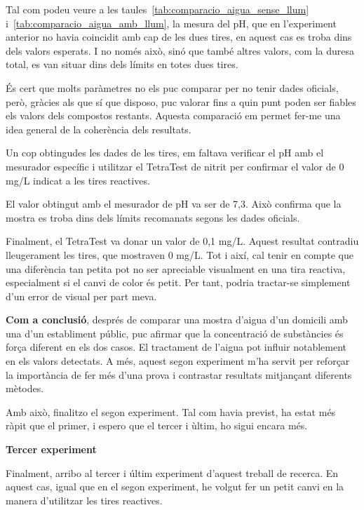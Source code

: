 Tal com podeu veure a les taules~\ref{tab:comparacio_aigua_sense_llum} i~\ref{tab:comparacio_aigua_amb_llum}, la mesura del pH, que en l’experiment anterior no havia coincidit amb cap de les dues tires, en aquest cas es troba dins dels valors esperats. I no només això, sinó que també altres valors, com la duresa total, es van situar dins dels límits en totes dues tires.

És cert que molts paràmetres no els puc comparar per no tenir dades oficials, però, gràcies als que sí que disposo, puc valorar fins a quin punt poden ser fiables els valors dels compostos restants. Aquesta comparació em permet fer-me una idea general de la coherència dels resultats.

Un cop obtingudes les dades de les tires, em faltava verificar el pH amb el mesurador específic i utilitzar el TetraTest de nitrit per confirmar el valor de 0 mg/L indicat a les tires reactives.

El valor obtingut amb el mesurador de pH va ser de 7,3. Això confirma que la mostra es troba dins dels límits recomanats segons les dades oficials.

Finalment, el TetraTest va donar un valor de 0,1 mg/L. Aquest resultat contradiu lleugerament les tires, que mostraven 0 mg/L. Tot i així, cal tenir en compte que una diferència tan petita pot no ser apreciable visualment en una tira reactiva, especialment si el canvi de color és petit. Per tant, podria tractar-se simplement d’un error de visual per part meva.

\textbf{Com a conclusió}, després de comparar una mostra d’aigua d’un domicili amb una d’un establiment públic, puc afirmar que la concentració de substàncies és força diferent en els dos casos. El tractament de l’aigua pot influir notablement en els valors detectats. A més, aquest segon experiment m’ha servit per reforçar la importància de fer més d’una prova i contrastar resultats mitjançant diferents mètodes.

Amb això, finalitzo el segon experiment. Tal com havia previst, ha estat més ràpit que el primer, i espero que el tercer i ùltim, ho sigui encara més.
\vspace{10cm}

{\Large \textbf{Tercer experiment}}
\newline

Finalment, arribo al tercer i últim experiment d’aquest treball de recerca. En aquest cas, igual que en el segon experiment, he volgut fer un petit canvi en la manera d’utilitzar les tires reactives.

